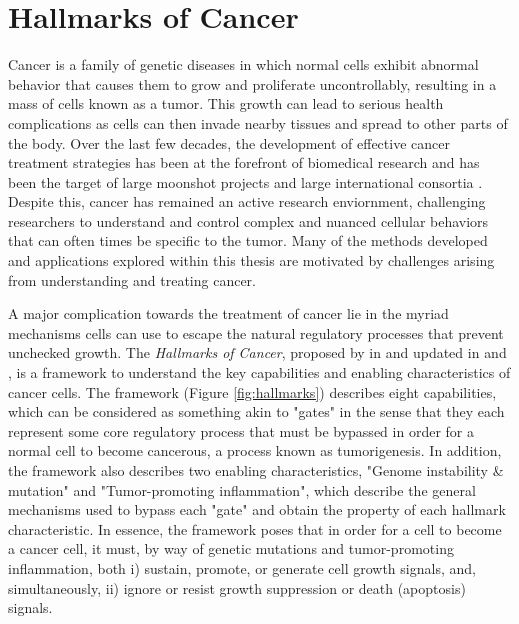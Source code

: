 \section{Hallmarks of Cancer}
Cancer is a family of genetic diseases in which normal cells exhibit abnormal behavior that causes them to grow and proliferate uncontrollably, resulting in a mass of cells known as a tumor.
This growth can lead to serious health complications as cells
can then invade nearby tissues and spread to other parts of the body.
Over the last few decades, the development of effective cancer treatment strategies has been at the forefront of biomedical research and has been the target of large moonshot projects \cite{need} and large international consortia \cite{icgc,tcga}.
Despite this, cancer has remained an active research enviornment, challenging researchers to understand and control complex and nuanced cellular behaviors that can often times be specific to the tumor.
Many of the methods developed and applications explored within this thesis are motivated by challenges arising from understanding and treating cancer.

A major complication towards the treatment of cancer lie in the myriad mechanisms cells can use to escape the natural regulatory processes that prevent unchecked growth.
The \emph{Hallmarks of Cancer}, proposed by \citeauthor{foo} in \citeyear{foo} and updated in \citeyear{foo} and \citeyear{foo}, is a framework to understand the key capabilities and enabling characteristics of cancer cells.
The framework (Figure \ref{fig:hallmarks}) describes eight capabilities, which can be considered as something akin to "gates" in the sense that they each represent some core regulatory process that must be bypassed in order for a normal cell to become cancerous, a process known as tumorigenesis.
In addition, the framework also describes two enabling characteristics, "Genome instability \& mutation" and "Tumor-promoting inflammation", which describe the general mechanisms used to bypass each "gate" and obtain the property of each hallmark characteristic.
In essence, the framework poses that in order for a cell to become a cancer cell, it must, by way of genetic mutations and tumor-promoting inflammation, both
i) sustain, promote, or generate cell growth signals, and, simultaneously,
ii) ignore or resist growth suppression or death (apoptosis) signals.

